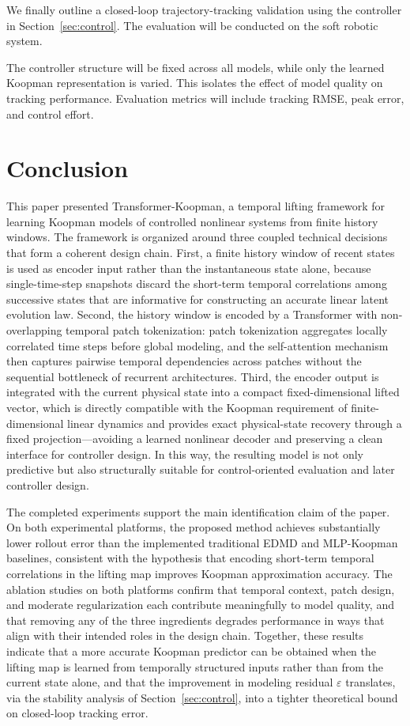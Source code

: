 \documentclass[journal]{IEEEtran}
\begin{document}
We finally outline a closed-loop trajectory-tracking validation using the controller in Section~\ref{sec:control}. The evaluation will be conducted on the soft robotic system.

The controller structure will be fixed across all models, while only the learned Koopman representation is varied. This isolates the effect of model quality on tracking performance. Evaluation metrics will include tracking RMSE, peak error, and control effort.

\section{Conclusion}
\label{sec:conclusion}

This paper presented Transformer-Koopman, a temporal lifting framework for learning Koopman models of controlled nonlinear systems from finite history windows. The framework is organized around three coupled technical decisions that form a coherent design chain. First, a finite history window of recent states is used as encoder input rather than the instantaneous state alone, because single-time-step snapshots discard the short-term temporal correlations among successive states that are informative for constructing an accurate linear latent evolution law. Second, the history window is encoded by a Transformer with non-overlapping temporal patch tokenization: patch tokenization aggregates locally correlated time steps before global modeling, and the self-attention mechanism then captures pairwise temporal dependencies across patches without the sequential bottleneck of recurrent architectures. Third, the encoder output is integrated with the current physical state into a compact fixed-dimensional lifted vector, which is directly compatible with the Koopman requirement of finite-dimensional linear dynamics and provides exact physical-state recovery through a fixed projection---avoiding a learned nonlinear decoder and preserving a clean interface for controller design. In this way, the resulting model is not only predictive but also structurally suitable for control-oriented evaluation and later controller design.

The completed experiments support the main identification claim of the paper. On both experimental platforms, the proposed method achieves substantially lower rollout error than the implemented traditional EDMD and MLP-Koopman baselines, consistent with the hypothesis that encoding short-term temporal correlations in the lifting map improves Koopman approximation accuracy. The ablation studies on both platforms confirm that temporal context, patch design, and moderate regularization each contribute meaningfully to model quality, and that removing any of the three ingredients degrades performance in ways that align with their intended roles in the design chain. Together, these results indicate that a more accurate Koopman predictor can be obtained when the lifting map is learned from temporally structured inputs rather than from the current state alone, and that the improvement in modeling residual $\varepsilon$ translates, via the stability analysis of Section~\ref{sec:control}, into a tighter theoretical bound on closed-loop tracking error.
\end{document}
